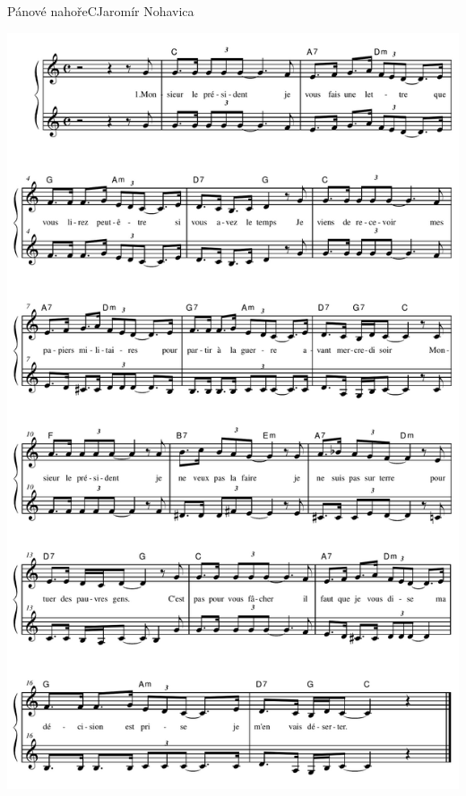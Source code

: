 \setcounter{page}{64}
\begin{song}{Pánové nahoře}{C}{Jaromír Nohavica}
\begin{center}
\includegraphics[height=0.9\textheight]{noty/a_pánové-nahoře} 
\end{center}
\end{song} \pagebreak
